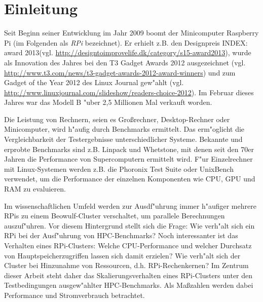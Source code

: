 \chapter{Einleitung}\label{Kap1}
\enlargethispage{0.7cm}
Seit Beginn seiner Entwicklung im Jahr 2009 boomt der Minicomputer Raspberry Pi (im Folgenden als \textit{RPi} bezeichnet). Er erhielt z.B. den Designpreis INDEX: award 2013\newline(vgl. \url{http://designtoimprovelife.dk/category/s15-award2013}), wurde als Innovation des Jahres bei den T3 Gadget Awards 2012 ausgezeichnet (vgl. \url{http://www.t3.com/news/t3-gadget-awards-2012-award-winners}) und zum Gadget of the Year 2012 des Linux Journal gew"ahlt (vgl. \url{http://www.linuxjournal.com/slideshow/readers-choice-2012}). Im Februar dieses Jahres war das Modell B "uber 2,5 Millionen Mal verkauft worden. 

Die Leistung von Rechnern, seien es Gro\ss rechner, Desktop-Rechner oder Minicomputer, wird h"aufig durch Benchmarks ermittelt. Das erm"oglicht die Vergleichbarkeit der Testergebnisse unterschiedlicher Systeme. Bekannte und erprobte Benchmarks sind z.B. Linpack und Whetstone, mit denen seit den 70er Jahren die Performance von Supercomputern ermittelt wird. F"ur Einzelrechner mit Linux-Systemen werden z.B. die Phoronix Test Suite oder UnixBench verwendet, um die Performance der einzelnen Komponenten wie CPU, GPU und RAM zu evaluieren. 

Im wissenschaftlichen Umfeld werden zur Ausdf"uhrung immer h"aufiger mehrere RPis zu einem Beowulf-Cluster verschaltet, um parallele Berechnungen auszuf"uhren. Vor diesem Hintergrund stellt sich die Frage: Wie verh"alt sich ein RPi bei der Ausf"uhrung von HPC-Benchmarks? Noch interessanter ist das Verhalten eines RPi-Clusters: Welche CPU-Performance und welcher Durchsatz von Hauptspeicherzugriffen lassen sich damit erzielen? Wie verh"alt sich der Cluster bei Hinzunahme von Ressourcen, d.h. RPi-Rechenkernen? Im Zentrum dieser Arbeit steht daher das Skalierungsverhalten eines RPi-Clusters unter den Testbedingungen ausgew"ahlter HPC-Benchmarks. Als Ma\ss zahlen werden dabei Performance und Stromverbrauch betrachtet. 

